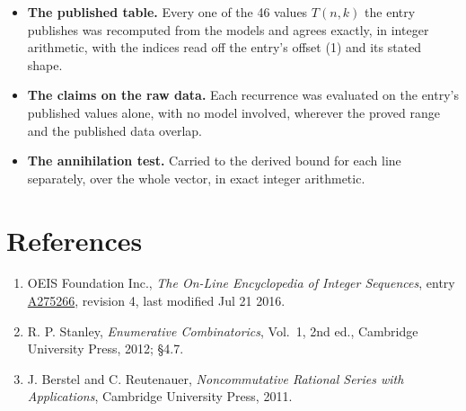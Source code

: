 \documentclass[11pt]{article}
\theoremstyle{definition}
\begin{document}
\begin{itemize}

\item {\bfseries The published table.} Every one of the 46 values $T(n,k)$ the entry publishes was recomputed from the models and agrees exactly, in integer arithmetic, with the indices read off the entry's offset (1) and its stated shape.

\item {\bfseries The claims on the raw data.} Each recurrence was evaluated on the entry's published values alone, with no model involved, wherever the proved range and the published data overlap.

\item {\bfseries The annihilation test.} Carried to the derived bound for each line separately, over the whole vector, in exact integer arithmetic.

\end{itemize}

\section{References}

\begin{enumerate}

\item OEIS Foundation Inc., \emph{The On-Line Encyclopedia of Integer Sequences}, entry \href{https://oeis.org/A275266}{A275266}, revision 4, last modified Jul 21 2016.

\item R. P. Stanley, \emph{Enumerative Combinatorics}, Vol.~1, 2nd ed., Cambridge University Press, 2012; \S4.7.

\item J. Berstel and C. Reutenauer, \emph{Noncommutative Rational Series with Applications}, Cambridge University Press, 2011.

\end{enumerate}
\end{document}
